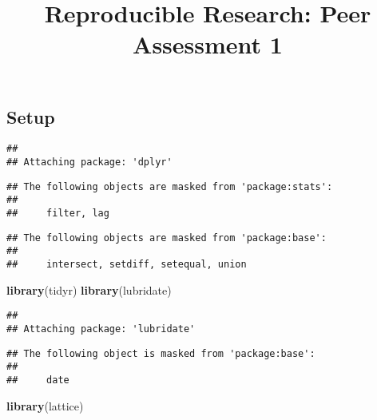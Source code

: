 \documentclass[]{article}
\title{Reproducible Research: Peer Assessment 1}
\author{}
\date{}
\newenvironment{Shaded}{\begin{snugshade}}{\end{snugshade}}
\newcommand{\KeywordTok}[1]{\textcolor[rgb]{0.13,0.29,0.53}{\textbf{#1}}}
\newcommand{\DataTypeTok}[1]{\textcolor[rgb]{0.13,0.29,0.53}{#1}}
\newcommand{\OtherTok}[1]{\textcolor[rgb]{0.56,0.35,0.01}{#1}}
\newcommand{\OperatorTok}[1]{\textcolor[rgb]{0.81,0.36,0.00}{\textbf{#1}}}
\newcommand{\NormalTok}[1]{#1}
\begin{document}
\maketitle

\subsection{Setup}\label{setup}

\begin{Shaded}
\end{Shaded}

\begin{verbatim}
## 
## Attaching package: 'dplyr'
\end{verbatim}

\begin{verbatim}
## The following objects are masked from 'package:stats':
## 
##     filter, lag
\end{verbatim}

\begin{verbatim}
## The following objects are masked from 'package:base':
## 
##     intersect, setdiff, setequal, union
\end{verbatim}

\begin{Shaded}
\begin{Highlighting}[]
\KeywordTok{library}\NormalTok{(tidyr)}
\KeywordTok{library}\NormalTok{(lubridate)}
\end{Highlighting}
\end{Shaded}

\begin{verbatim}
## 
## Attaching package: 'lubridate'
\end{verbatim}

\begin{verbatim}
## The following object is masked from 'package:base':
## 
##     date
\end{verbatim}

\begin{Shaded}
\begin{Highlighting}[]
\KeywordTok{library}\NormalTok{(lattice)}
\end{Highlighting}
\end{Shaded}
\end{document}
